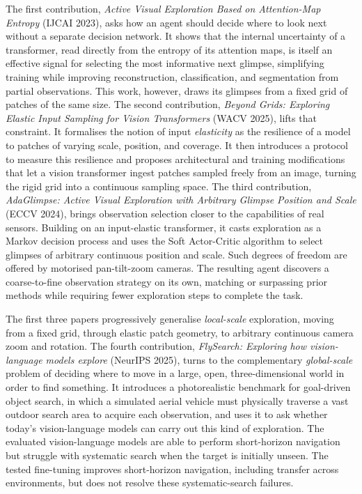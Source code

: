 The first contribution, \emph{Active Visual Exploration Based on Attention-Map Entropy} (IJCAI 2023), asks how an agent should decide where to look next without a separate decision network. It shows that the internal uncertainty of a transformer, read directly from the entropy of its attention maps, is itself an effective signal for selecting the most informative next glimpse, simplifying training while improving reconstruction, classification, and segmentation from partial observations. This work, however, draws its glimpses from a fixed grid of patches of the same size. The second contribution, \emph{Beyond Grids: Exploring Elastic Input Sampling for Vision Transformers} (WACV 2025), lifts that constraint. It formalises the notion of input \emph{elasticity} as the resilience of a model to patches of varying scale, position, and coverage. It then introduces a protocol to measure this resilience and proposes architectural and training modifications that let a vision transformer ingest patches sampled freely from an image, turning the rigid grid into a continuous sampling space. The third contribution, \emph{AdaGlimpse: Active Visual Exploration with Arbitrary Glimpse Position and Scale} (ECCV 2024), brings observation selection closer to the capabilities of real sensors. Building on an input-elastic transformer, it casts exploration as a Markov decision process and uses the Soft Actor-Critic algorithm to select glimpses of arbitrary continuous position and scale. Such degrees of freedom are offered by motorised pan-tilt-zoom cameras. The resulting agent discovers a coarse-to-fine observation strategy on its own, matching or surpassing prior methods while requiring fewer exploration steps to complete the task.

The first three papers progressively generalise \emph{local-scale} exploration, moving from a fixed grid, through elastic patch geometry, to arbitrary continuous camera zoom and rotation. The fourth contribution, \emph{FlySearch: Exploring how vision-language models explore} (NeurIPS 2025), turns to the complementary \emph{global-scale} problem of deciding where to move in a large, open, three-dimensional world in order to find something. It introduces a photorealistic benchmark for goal-driven object search, in which a simulated aerial vehicle must physically traverse a vast outdoor search area to acquire each observation, and uses it to ask whether today's vision-language models can carry out this kind of exploration. The evaluated vision-language models are able to perform short-horizon navigation but struggle with systematic search when the target is initially unseen. The tested fine-tuning improves short-horizon navigation, including transfer across environments, but does not resolve these systematic-search failures.

